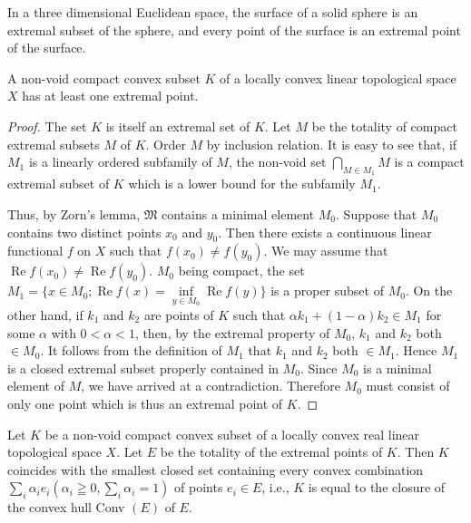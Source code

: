 \begin{examplen} In a three dimensional Euclidean space, the surface of a solid sphere is an extremal subset of the sphere, and every point of the surface is an extremal point of the surface.

\end{examplen}
\begin{theoremn} A non-void compact convex subset $K$ of a locally convex linear topological space $X$ has at least one extremal point.

\end{theoremn}
\begin{proof}
 The set $K$ is itself an extremal set of $K$. Let $M$ be the totality of compact extremal subsets $M$ of $K$. Order $M$ by inclusion relation. It is easy to see that, if $M_{1}$ is a linearly ordered subfamily of $M$, the non-void set $\bigcap\limits_{M\in M_{1}}M$ is a compact extremal subset of $K$ which is a lower bound for the subfamily $M_{1}$. 

Thus, by Zorn's lemma, $\mathfrak{M}$ contains a minimal element $M_0$. Suppose that $M_0$ contains two distinct points $x_0$ and $y_0$. Then there exists a continuous linear functional $f$ on $X$ such that $f(x_0) \neq f(y_0)$. We may assume that $\operatorname{Re} f(x_0) \neq \operatorname{Re} f(y_0)$. $M_0$ being compact, the set $M_1 = \{x \in M_0; \operatorname{Re} f(x) = \inf\limits_{y \in M_0} \operatorname{Re} f(y)\}$ is a proper subset of $M_0$. On the other hand, if $k_1$ and $k_2$ are points of $K$ such that $\alpha k_1 + (1 - \alpha) k_2 \in M_1$ for some $\alpha$ with $0 < \alpha < 1$, then, by the extremal property of $M_{0}$, $k_{1}$ and $k_{2}$ both $\in M_{0}$. It follows from the definition of $M_{1}$ that $k_{1}$ and $k_{2}$ both $\in M_{1}$. Hence $M_{1}$ is a closed extremal subset properly contained in $M_{0}$. Since $M_{0}$ is a minimal element of $M$, we have arrived at a contradiction. Therefore $M_{0}$ must consist of only one point which is thus an extremal point of $K$. 
\end{proof}
\begin{corollaryu} Let $K$ be a non-void compact convex subset of a locally convex real linear topological space $X$. Let $E$ be the totality of the extremal points of $K$. Then $K$ coincides with the smallest closed set containing every convex combination $\sum\limits_{i} \alpha_{i} e_{i} (\alpha_{i} \geqq 0, \sum\limits_{i} \alpha_{i} = 1)$ of points $e_{i} \in E$, i.e., $K$ is equal to the closure of the convex hull Conv $(E)$ of $E$. 
\end{corollaryu}

